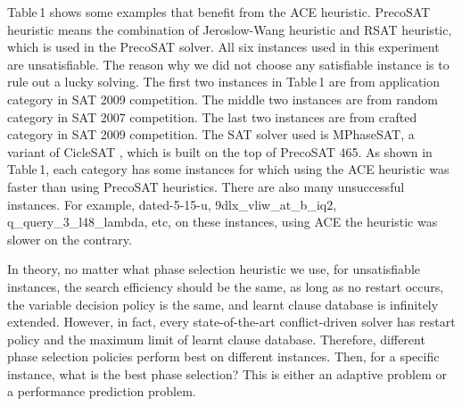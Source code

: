 \documentclass{llncs}
\begin{document}
Table\,1 shows some examples that benefit from the ACE heuristic.
PrecoSAT heuristic means the combination of Jeroslow-Wang heuristic
and RSAT heuristic, which is used in the PrecoSAT solver. All six
instances used in this experiment are unsatisfiable. The reason why
we did not choose any satisfiable instance is to rule out a lucky
solving. The first two instances in Table\,1 are from application
category in SAT 2009 competition. The middle two instances are from
random category in SAT 2007 competition. The last two instances are
from crafted category in SAT 2009 competition. The SAT solver used
is MPhaseSAT, a variant of CicleSAT \cite {CircleSAT:13}, which is
built on the top of PrecoSAT 465. As shown in Table\,1, each
category has some instances for which using the ACE heuristic was
faster than using PrecoSAT heuristics. There are also many
unsuccessful instances. For example, dated-5-15-u,
9dlx\_vliw\_at\_b\_iq2, q\_query\_3\_l48\_lambda, etc, on these
instances, using ACE the heuristic was slower on the contrary.

In theory, no matter what phase selection heuristic we use, for
unsatisfiable instances, the search efficiency should be the same,
as long as no restart occurs, the variable decision policy is the
same, and learnt clause database is infinitely extended. However, in
fact, every state-of-the-art conflict-driven solver has restart
policy and the maximum limit of learnt clause database. Therefore,
different phase selection policies perform best on different
instances. Then, for a specific instance, what is the best phase
selection? This is either an adaptive problem or a performance
prediction problem.
\end{document}
